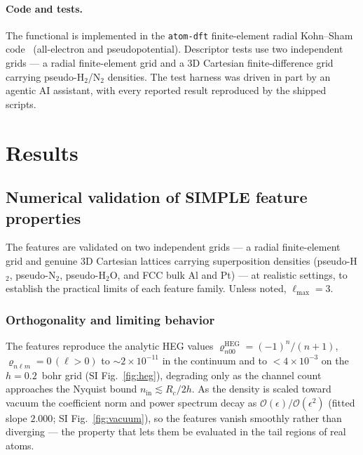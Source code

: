 \documentclass[aps,prb,reprint,superscriptaddress,nofootinbib]{revtex4-2}
\newcommand{\Rc}{R_{c}}
\newcommand{\nin}{n_{\mathrm{in}}}
\begin{document}
\paragraph*{Code and tests.}
The functional is implemented in the \texttt{atom-dft} finite-element radial
Kohn--Sham code~\cite{Kohn_1965,Hohenberg_1964} (all-electron and
pseudopotential). Descriptor tests use two independent grids --- a radial
finite-element grid and a 3D Cartesian finite-difference grid carrying
pseudo-H$_2$/N$_2$ densities. The test harness was driven in part by an agentic AI
assistant, with every reported result reproduced by the shipped scripts.

\section{Results}

\subsection{Numerical validation of SIMPLE feature properties}
\label{sec:results-features}

The features are validated on two independent grids --- a radial finite-element grid
and genuine 3D Cartesian lattices carrying superposition densities (pseudo-H$_2$,
pseudo-N$_2$, pseudo-H$_2$O, and FCC bulk Al and Pt) --- at realistic settings, to
establish the practical limits of each feature family. Unless noted, $\ell_{\max}=3$.

\subsubsection{Orthogonality and limiting behavior}
\label{sec:results-ortho}

The features reproduce the analytic HEG values
$\varrho^{\mathrm{HEG}}_{n00}=(-1)^n/(n+1)$, $\varrho_{n\ell m}=0\,(\ell>0)$ to
$\sim2\times10^{-11}$ in the continuum and to $<4\times10^{-3}$ on the $h=0.2$~bohr
grid (SI Fig.~\ref{fig:heg}), degrading only as the channel count approaches the
Nyquist bound $\nin\lesssim\Rc/2h$. As the density is scaled toward vacuum the
coefficient norm and power spectrum decay as
$\mathcal O(\epsilon)/\mathcal O(\epsilon^2)$ (fitted slope $2.000$; SI
Fig.~\ref{fig:vacuum}), so the features vanish smoothly rather than diverging --- the
property that lets them be evaluated in the tail regions of real atoms.
\end{document}
